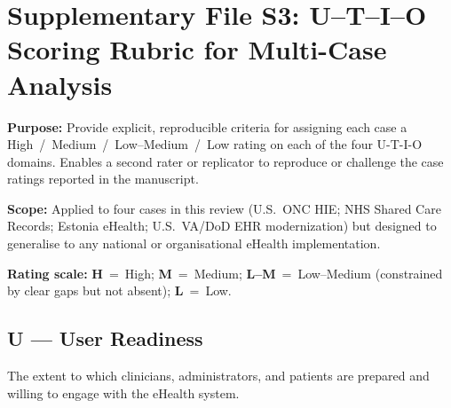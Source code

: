 
\newpage
\section*{Supplementary File S3: U--T--I--O Scoring Rubric for Multi-Case Analysis}
\label{sec:S3}

\noindent\textbf{Purpose:} Provide explicit, reproducible criteria for assigning each case a
High~/~Medium~/~Low--Medium~/~Low rating on each of the four U-T-I-O domains.
Enables a second rater or replicator to reproduce or challenge the case ratings
reported in the manuscript.

\noindent\textbf{Scope:} Applied to four cases in this review (U.S.\ ONC HIE; NHS Shared Care
Records; Estonia eHealth; U.S.\ VA/DoD EHR modernization) but designed to generalise
to any national or organisational eHealth implementation.

\noindent\textbf{Rating scale:} \textbf{H}~=~High;\; \textbf{M}~=~Medium;\;
\textbf{L--M}~=~Low--Medium (constrained by clear gaps but not absent);\;
\textbf{L}~=~Low.

\bigskip


\subsection*{U --- User Readiness}

\noindent The extent to which clinicians, administrators, and patients are prepared and
willing to engage with the eHealth system.

\renewcommand{\arraystretch}{1.3}
\setlength{\tabcolsep}{4pt}

